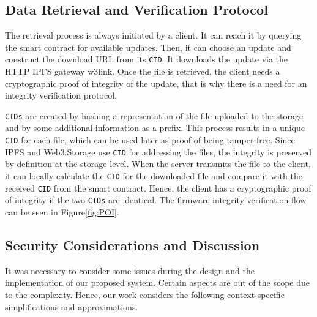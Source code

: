 \documentclass[conference]{IEEEtran}
\begin{document}
\subsection{Data Retrieval and Verification Protocol}

The retrieval process is always initiated by a client. It can reach it by querying the smart contract for available updates. Then, it can choose an update and construct the download URL from its \texttt{CID}. It downloads the update via the HTTP IPFS gateway w3link. Once the file is retrieved, the client needs a cryptographic proof of integrity of the update, that is why there is a need for an integrity verification protocol.

\texttt{CIDs} are created by hashing a representation of the file uploaded to the storage and by some additional information as a prefix. This process results in a unique \texttt{CID} for each file, which can be used later as proof of being tamper-free. Since IPFS and Web3.Storage use \texttt{CID} for addressing the files, the integrity is preserved by definition at the storage level. When the server transmits the file to the client, it can locally calculate the \texttt{CID} for the downloaded file and compare it with the received \texttt{CID} from the smart contract. Hence, the client has a cryptographic proof of integrity if the two \texttt{CIDs} are identical. The firmware integrity verification flow can be seen in Figure\ref{fig:POI}.



\subsection{Security Considerations and Discussion}

It was necessary to consider some issues during the design and the implementation of our proposed system. Certain aspects are out of the scope due to the complexity. Hence, our work considers the following context-specific simplifications and approximations.
\end{document}
